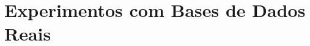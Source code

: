 \documentclass[
    12pt,                %
    oneside,            %
    a4paper,            %
    english,            %
    brazil                %
    ]{abntex2ppgsi}
\begin{document}






\section{Experimentos com Bases de Dados Reais}

\end{document}
